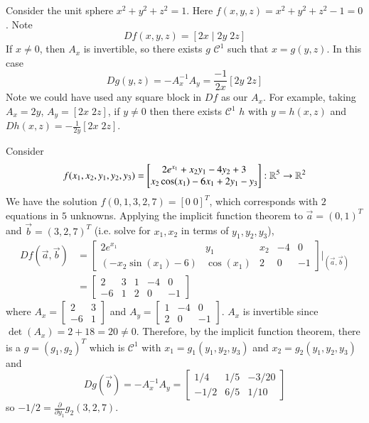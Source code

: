 \begin{example}
    Consider the unit sphere $x^2+y^2+z^2=1.$ Here $f(x,y,z) = x^2+y^2+z^2 - 1 = 0$. Note $$Df(x,y,z) = [2x\; \vert\; 2y\;2z]$$ If $x \neq 0$, then $A_x$ is invertible, so there exists $g$ $\mathcal{C}^1$ such that $x = g(y,z)$. In this case $$Dg(y,z) = -A_x^{-1}A_y = \frac{-1}{2x}[2y\;2z]$$ Note we could have used any square block in $Df$ as our $A_x$. For example, taking $A_x = 2y$, $A_y = [2x\;2z]$, if $y \neq 0$ then there exists $\mathcal{C}^1$ $h$ with $y = h(x,z)$ and $Dh(x,z) = -\frac{1}{2y}[2x\;2z]$.
\end{example}


\begin{example}
    Consider $$f(x_1,x_2,y_1,y_2,y_3) = \begin{bmatrix} 2e^{x_1}+x_2y_1-4y_2+3 \\ x_2\cos(x_1)-6x_1+2y_1-y_3\end{bmatrix}:\mathbb R^5\rightarrow \mathbb R^2$$
    We have the solution $f(0,1,3,2,7) = [0\;0]^T$, which corresponds with $2$ equations in $5$ unknowns. Applying the implicit function theorem to $\vec{a} = (0,1)^T$ and $\vec{b} = (3,2,7)^T$ (i.e. solve for $x_1,x_2$ in terms of $y_1,y_2,y_3$), \begin{align*}
        Df(\vec{a},\vec{b}) &= \begin{bmatrix} 2e^{x_1} & y_1 & x_2 & -4 & 0 \\ (-x_2\sin(x_1) - 6) & \cos(x_1) & 2 & 0 & -1 \end{bmatrix}\Bigg\rvert_{(\vec{a},\vec{b})} \\
        &= \begin{bmatrix} 2 & 3 & 1 & -4 & 0 \\ -6 & 1 & 2 & 0 & -1 \end{bmatrix}
    \end{align*}
    where $A_x = \begin{bmatrix} 2 & 3 \\ -6 & 1\end{bmatrix}$ and $A_y = \begin{bmatrix} 1 & -4 & 0 \\ 2 & 0 & -1\end{bmatrix}$. $A_x$ is invertible since $\det(A_x) = 2+18 = 20 \neq 0$. Therefore, by the implicit function theorem, there is a $g = (g_1,g_2)^T$ which is $\mathcal{C}^1$ with $x_1 = g_1(y_1,y_2,y_3)$ and $x_2 = g_2(y_1,y_2,y_3)$ and $$Dg(\vec{b}) = -A_x^{-1}A_y = \begin{bmatrix} 1/4 & 1/5 & -3/20 \\ -1/2 & 6/5 & 1/10 \end{bmatrix}$$ so $-1/2 = \frac{\partial }{\partial y_1}g_2(3,2,7)$.



\end{example}
